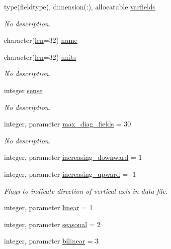 \begin{DoxyCompactItemize}
type(fieldtype), dimension(\+:), allocatable \hyperlink{namespaceinterpolator__mod_af171b4d632062544e7d7a901d55873f9}{varfields}
\begin{DoxyCompactList}\small\item\em No description. \end{DoxyCompactList}\item 
character(\hyperlink{namespaceinterpolator__mod_a6bd2ec3395203e1b6aba0610bfbfe16b}{len}=32) \hyperlink{namespaceinterpolator__mod_a04dfc32d8f8b7d8b153f0f2c340dc07d}{name}
\item 
character(\hyperlink{namespaceinterpolator__mod_a6bd2ec3395203e1b6aba0610bfbfe16b}{len}=32) \hyperlink{namespaceinterpolator__mod_a36fe3672b1616046ddec710084683407}{units}
\begin{DoxyCompactList}\small\item\em No description. \end{DoxyCompactList}\item 
integer \hyperlink{namespaceinterpolator__mod_abdb646751cdc1ebd26725fe4ab4ccd82}{sense}
\begin{DoxyCompactList}\small\item\em No description. \end{DoxyCompactList}\item 
integer, parameter \hyperlink{namespaceinterpolator__mod_ab8f01630409343faf00eff7cf2e78bdb}{max\+\_\+diag\+\_\+fields} = 30
\begin{DoxyCompactList}\small\item\em No description. \end{DoxyCompactList}\item 
integer, parameter \hyperlink{namespaceinterpolator__mod_aaa4b631264950af751c2bb61f8e19dea}{increasing\+\_\+downward} = 1
\item 
integer, parameter \hyperlink{namespaceinterpolator__mod_ae43c206a51b0098e312ae576c2fd3a3f}{increasing\+\_\+upward} = -\/1
\begin{DoxyCompactList}\small\item\em Flags to indicate direction of vertical axis in data file. \end{DoxyCompactList}\item 
integer, parameter \hyperlink{namespaceinterpolator__mod_ad23bea282e48076ad879fc1765f39d33}{linear} = 1
\item 
integer, parameter \hyperlink{namespaceinterpolator__mod_ab2befb1b590b857a49f22536716db35d}{seasonal} = 2
\item 
integer, parameter \hyperlink{namespaceinterpolator__mod_a64b64cb9cf29aa6f001fc15e47b3380c}{bilinear} = 3

\end{DoxyCompactItemize}
